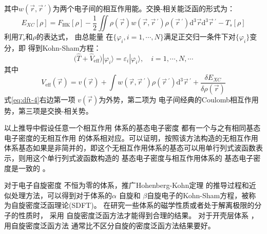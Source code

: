 {其中{$w(\vec r, \vec r\,^{\prime})$为两个电子间的相互作用能。}交换-相关能泛函的形式为：
\begin{equation} 
  \label{eq:dft-2}
  E_{XC}[\rho]=F_{\mathrm{HK}}[\rho]-\frac 12\iint{\rho(\vec{r}) w(\vec{r},\vec r\,^{\prime})\rho(\vec r\,^{\prime})\textrm{d}^3\vec{r}\textrm{d}^3\vec r\,^{\prime}}-T_{s}[\rho]
\end{equation}
利用$T_s$和$\rho$的表达式，%
{由}总能量%
{在$\{\varphi_i, i\!=\!1,\cdots, N\}$满足正交归一条件下对$\{\varphi_i\}$}变分，即%
得到Kohn-Sham方程：
\begin{equation} \label{eq:dft-3}
	\bigl(\hat{T}+\hat{V}_{\mathrm{eff}}\bigr)|\varphi_{i}\rangle=\varepsilon_{i}|\varphi_{i}\rangle{,\quad i=1,\cdots,N,\cdots}
\end{equation}
其中
\begin{equation} \label{eq:dft-4}
	V_{\mathrm{eff}}(\vec{r})={v}(\vec{r})+\int{w(\vec{r},\vec r\,^{\prime})\rho(\vec r\,^{\prime})\textrm{d}^3{\vec r\,^{\prime}}+\frac{\delta E_{XC}}{\delta\rho(\vec{r})
}}
\end{equation}
式\eqref{eq:dft-4}右边第一项%
${v}(\vec{r})
$为外势，第二项为%
{电}子间经典的{Coulomb}相互作用势，第三项是交换-相关势。%

以上推导中假设任意一个相互作用%
{体系的基态电}子密度%
{都有一个}与之有相同基态电子密度的无相互作用%
{的体系相对应}。可以证明，按照该方法构造的无相互作用体系基态如果是非简并的，即这个无相互作用体系的基态可以用单行列式波函数表示，则用这个单行列式波函数构造的%
{基态电}子密度与相互作用体系的%
{基态电}子密度是一致的%
。%

对于{电子}自旋{密度}%
{不恒为零的体系，推广}Hohenberg-Kohn定理%
{的推导过程和近似处理方法，可以得到对于体系的}$\alpha$%
自旋和%
{$\beta$自旋}电子的{\textrm{Kohn-Sham}方程，被称为自旋密度泛函理论\textrm{(SDFT)}。}%
{在}研究一些体系的磁学性质或者处于解离极限的分子的性质{时}，%
采用%
自旋密度泛函方法才能得到合理的结果{。}%
对于开壳层体系%
，用自旋密度泛函方法%
通常比不{区}分自旋的密度泛函方法结果要好。%

}
